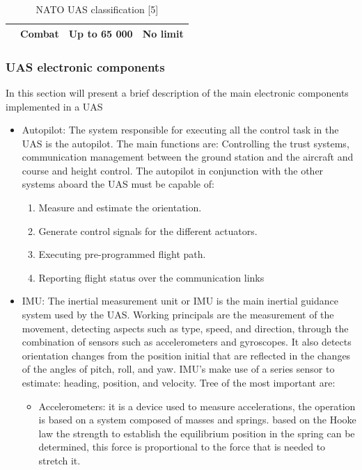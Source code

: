 \begin{table}[H]
\begin{tabular}{|c|c|c|c|}
                                                                                         & Combat                                                                          & Up to 65 000            & No limit        \\ \hline
\end{tabular}
\caption{NATO UAS classification [5]}
\label{table:NATO UAS classification}
\end{table}
\subsubsection{UAS electronic components}    
In this section will present a brief description of the main electronic components implemented in a UAS
\begin{itemize}
\item Autopilot: The system responsible for executing all the control task in the UAS is the autopilot. The main functions are: Controlling the trust systems, communication management between the ground station and the aircraft and course and height control.
The autopilot in conjunction with the other systems aboard the UAS must be capable of: \begin{enumerate}
\item Measure and estimate the orientation.
\item Generate control signals for the different actuators.
\item Executing pre-programmed flight path.
\item Reporting flight status over the communication links 
\end{enumerate}
\item IMU: The inertial measurement unit or IMU is the main inertial guidance system used by the UAS. Working principals are the measurement of the movement, detecting aspects such as type, speed, and direction, through the combination of sensors such as accelerometers and gyroscopes. It also detects orientation changes from the position initial that are reflected in the changes of the angles of pitch, roll, and yaw. \cite{Inertial}
IMU's make use of a series sensor to estimate: heading, position, and velocity\cite{IMU}. Tree of the most important are\cite{IMU}:
\begin{itemize}
\item Accelerometers: it is a device used to measure accelerations, the operation is based on a system composed of masses and springs. based on the Hooke law the strength to establish the equilibrium position in
the spring can be determined, this force is proportional to the force that is needed to stretch it\cite{JD}.

\end{itemize}
\end{itemize}
